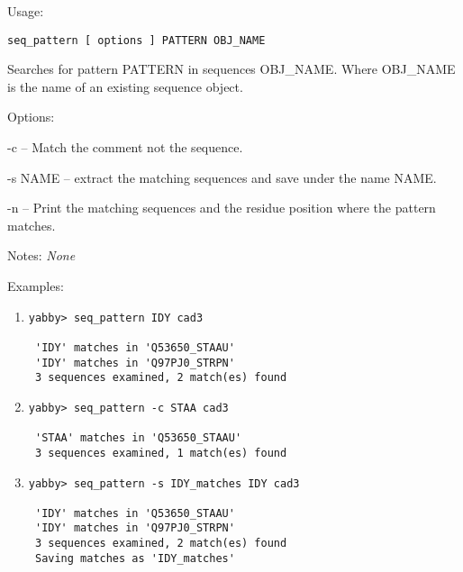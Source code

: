 \begin{description}


\item{Usage:}

{\tt seq\_pattern [ options ] PATTERN OBJ\_NAME}

Searches for pattern PATTERN in sequences OBJ\_NAME.
Where OBJ\_NAME is the name of an existing sequence object.


\item{Options:}
\begin{description}
\item -c -- Match the comment not the sequence.
\item -s NAME -- extract the matching sequences and save under
    the name NAME.
\item -n -- Print the matching sequences and the residue position
    where the pattern matches.
\end{description}


\item{Notes:} {\em None}


\item{Examples:}
\begin{enumerate}

\item
\begin{verbatim}
yabby> seq_pattern IDY cad3

 'IDY' matches in 'Q53650_STAAU'
 'IDY' matches in 'Q97PJ0_STRPN'
 3 sequences examined, 2 match(es) found

\end{verbatim}

\item
\begin{verbatim}
yabby> seq_pattern -c STAA cad3

 'STAA' matches in 'Q53650_STAAU'
 3 sequences examined, 1 match(es) found

\end{verbatim}

\item
\begin{verbatim}
yabby> seq_pattern -s IDY_matches IDY cad3

 'IDY' matches in 'Q53650_STAAU'
 'IDY' matches in 'Q97PJ0_STRPN'
 3 sequences examined, 2 match(es) found
 Saving matches as 'IDY_matches'


\end{verbatim}
\end{enumerate}
\end{description}
